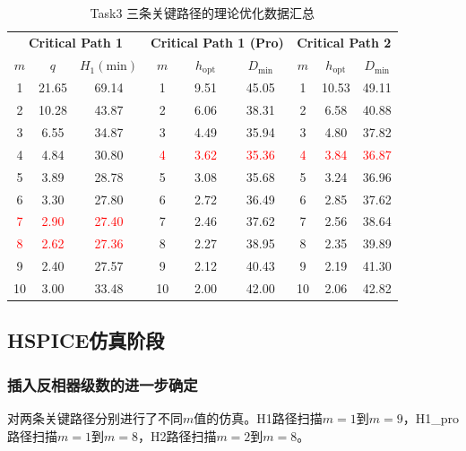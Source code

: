\documentclass[UTF8,12pt,a4paper]{ctexart}
\begin{document}
\begin{table}[htbp]
    \centering
    \caption{Task3 三条关键路径的理论优化数据汇总}
    \label{tab:task3_theo_opt_all}
    \small
    \begin{tabular}{ccc|ccc|ccc}
    \toprule
    \multicolumn{3}{c|}{\textbf{Critical Path 1}} & \multicolumn{3}{c|}{\textbf{Critical Path 1 (Pro)}} & \multicolumn{3}{c}{\textbf{Critical Path 2}} \\
    $m$ & $q$ & $H_{1}(\text{min})$ & $m$ & $h_{\text{opt}}$ & $D_{\text{min}}$ & $m$ & $h_{\text{opt}}$ & $D_{\text{min}}$ \\
    \midrule
    1 & 21.65 & 69.14 & 1 & 9.51 & 45.05 & 1 & 10.53 & 49.11 \\
    2 & 10.28 & 43.87 & 2 & 6.06 & 38.31 & 2 & 6.58 & 40.88 \\
    3 & 6.55 & 34.87 & 3 & 4.49 & 35.94 & 3 & 4.80 & 37.82 \\
    4 & 4.84 & 30.80 & \textcolor{red}{4} & \textcolor{red}{3.62} & \textcolor{red}{35.36} & \textcolor{red}{4} & \textcolor{red}{3.84} & \textcolor{red}{36.87} \\
    5 & 3.89 & 28.78 & 5 & 3.08 & 35.68 & 5 & 3.24 & 36.96 \\
    6 & 3.30 & 27.80 & 6 & 2.72 & 36.49 & 6 & 2.85 & 37.62 \\
    \textcolor{red}{7} & \textcolor{red}{2.90} & \textcolor{red}{27.40} & 7 & 2.46 & 37.62 & 7 & 2.56 & 38.64 \\
    \textcolor{red}{8} & \textcolor{red}{2.62} & \textcolor{red}{27.36} & 8 & 2.27 & 38.95 & 8 & 2.35 & 39.89 \\
    9 & 2.40 & 27.57 & 9 & 2.12 & 40.43 & 9 & 2.19 & 41.30 \\
    10 & 3.00 & 33.48 & 10 & 2.00 & 42.00 & 10 & 2.06 & 42.82 \\
    \bottomrule
    \end{tabular}
\end{table}

\subsection{HSPICE仿真阶段}

\subsubsection{插入反相器级数的进一步确定}

对两条关键路径分别进行了不同$m$值的仿真。H1路径扫描$m=1$到$m=9$，H1\_pro路径扫描$m = 1$到$m = 8$，H2路径扫描$m = 2$到$m = 8$。
\end{document}
